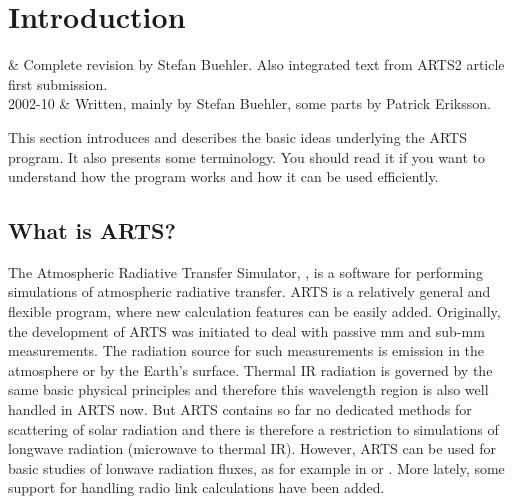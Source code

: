 \chapter{Introduction}
\label{sec:concept}

 & Complete revision by Stefan Buehler. Also integrated text
         from ARTS2 article first submission.\\
2002-10 & Written, mainly by Stefan Buehler, some parts by Patrick Eriksson. 
\stophistory

\graphicspath{{Figs/concept/}}


This section introduces and describes the basic ideas underlying the
ARTS program. It also presents some terminology. You should read
it if you want to understand how the program works and how it can be
used efficiently.



\section{What is ARTS?}

The Atmospheric Radiative Transfer Simulator, , is a software
for performing simulations of atmospheric radiative transfer. ARTS is a
relatively general and flexible program, where new calculation features can be
easily added. Originally, the development of ARTS was initiated to deal with
passive mm and sub-mm measurements. The radiation source for such measurements
is emission in the atmosphere or by the Earth's surface. Thermal IR radiation
is governed by the same basic physical principles and therefore this wavelength
region is also well handled in ARTS now. But ARTS contains so far no dedicated
methods for scattering of solar radiation and there is therefore a restriction
to simulations of longwave radiation (microwave to thermal IR). However, ARTS
can be used for basic studies of lonwave radiation fluxes, as for example in
\citet{buehler:recen:06} or \citet{john:under:06}. More lately, some support
for handling radio link calculations have been added.

